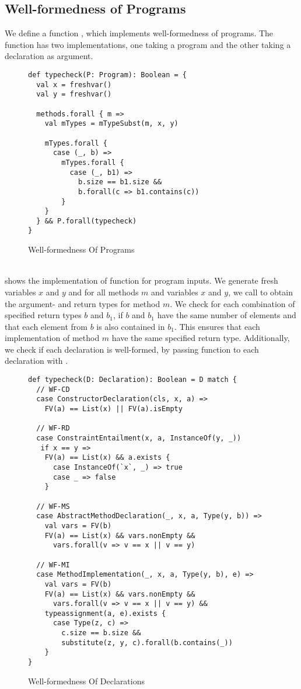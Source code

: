 \subsection{Well-formedness of Programs}
\label{sec:wf}
We define a function ,
which implements well-formedness of programs.
The function has two implementations,
one taking a program
and the other taking a declaration
as argument.
%
\begin{figure}[h]
\begin{lstlisting}
def typecheck(P: Program): Boolean = {
  val x = freshvar()
  val y = freshvar()

  methods.forall { m =>
    val mTypes = mTypeSubst(m, x, y)

    mTypes.forall {
      case (_, b) =>
        mTypes.forall {
          case (_, b1) =>
            b.size == b1.size &&
            b.forall(c => b1.contains(c))
        }
    }
  } && P.forall(typecheck)
}
\end{lstlisting}
\caption{Well-formedness Of Programs}
\label{fig:scala-wf-prog}
\end{figure}\\
%
 shows the implementation
of function  for program inputs.
We generate fresh variables $x$ and $y$
and for all methods $m$ and variables $x$ and $y$,
we call  to obtain the argument- and return types for method $m$.
We check for each combination of specified return types  $b$ and $b_1$,
if $b$ and $b_1$ have the same number of elements
and that each element from $b$ is also contained in $b_1$.
This ensures that each implementation of method $m$
have the same specified return type.
%
Additionally, we check if each declaration is well-formed,
by passing function  to each declaration
with .
%
\begin{figure}[t]
\begin{lstlisting}
def typecheck(D: Declaration): Boolean = D match {
  // WF-CD
  case ConstructorDeclaration(cls, x, a) =>
    FV(a) == List(x) || FV(a).isEmpty
    
  // WF-RD
  case ConstraintEntailment(x, a, InstanceOf(y, _))
   if x == y =>
    FV(a) == List(x) && a.exists {
      case InstanceOf(`x`, _) => true
      case _ => false
    }
    
  // WF-MS
  case AbstractMethodDeclaration(_, x, a, Type(y, b)) =>
    val vars = FV(b)
    FV(a) == List(x) && vars.nonEmpty &&
      vars.forall(v => v == x || v == y)
      
  // WF-MI
  case MethodImplementation(_, x, a, Type(y, b), e) =>
    val vars = FV(b)
    FV(a) == List(x) && vars.nonEmpty &&
      vars.forall(v => v == x || v == y) &&
    typeassignment(a, e).exists {
      case Type(z, c) =>
        c.size == b.size &&
        substitute(z, y, c).forall(b.contains(_))
    }
}
\end{lstlisting}
\caption{Well-formedness Of Declarations}
\label{fig:scala-wf-decl}
\end{figure}\\

